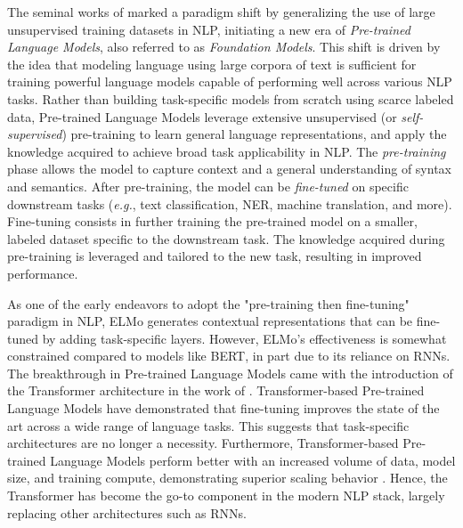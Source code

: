 The seminal works of \citet{peters-etal-2018-deep, devlin2018bert, radford2018improving} marked a paradigm shift by generalizing the use of large unsupervised training datasets in \ac{NLP}, initiating a new era of \textit{Pre-trained Language Models}, also referred to as \textit{Foundation Models}. This shift is driven by the idea that modeling language using large corpora of text is sufficient for training powerful language models capable of performing well across various \ac{NLP} tasks. Rather than building task-specific models from scratch using scarce labeled data, Pre-trained Language Models leverage extensive unsupervised (or \textit{self-supervised}) pre-training to learn general language representations, and apply the knowledge acquired to achieve broad task applicability in \ac{NLP}. The \textit{pre-training} phase allows the model to capture context and a general understanding of syntax and semantics. After pre-training, the model can be \textit{fine-tuned} on specific downstream tasks (\textit{e.g.}, text classification, \ac{NER}, machine translation, and more). Fine-tuning consists in further training the pre-trained model on a smaller, labeled dataset specific to the downstream task. The knowledge acquired during pre-training is leveraged and tailored to the new task, resulting in improved performance.


As one of the early endeavors to adopt the "pre-training then fine-tuning" paradigm in \ac{NLP}, \ac{ELMo} generates contextual representations that can be fine-tuned by adding task-specific layers. However, \ac{ELMo}'s effectiveness is somewhat constrained compared to models like \ac{BERT}, in part due to its reliance on \acp{RNN}. The breakthrough in Pre-trained Language Models came with the introduction of the Transformer architecture in the work of \citet{vaswani2017attention}. Transformer-based Pre-trained Language Models \citep{devlin2018bert, radford2018improving} have demonstrated that fine-tuning improves the state of the art across a wide range of language tasks. This suggests that task-specific architectures are no longer a necessity. Furthermore, Transformer-based Pre-trained Language Models perform better with an increased volume of data, model size, and training compute, demonstrating superior scaling behavior \citep{kaplan2020scaling}. Hence, the Transformer has become the go-to component in the modern \ac{NLP} stack, largely replacing other architectures such as \acp{RNN}. 

